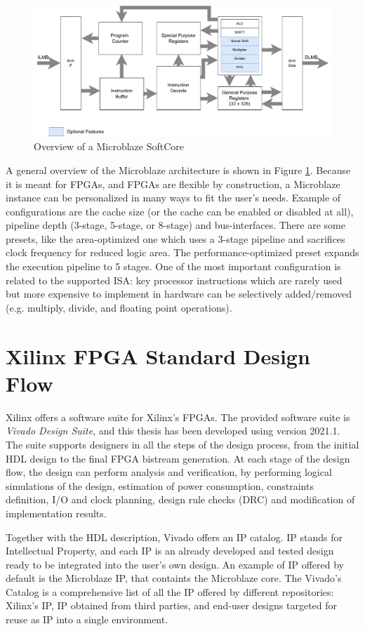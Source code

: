 \begin{figure}[H]
\centering
\includegraphics[width=0.8\linewidth]{images/chapter3/ublaze_arch.pdf}
\caption{Overview of a Microblaze SoftCore}
\label{fig:ublaze}
\end{figure}

A general overview of the Microblaze architecture is shown in Figure \ref{fig:ublaze}. Because it is meant for FPGAs, and FPGAs are flexible by construction, a Microblaze instance can be personalized in many ways to fit the user's needs. Example of configurations are the cache size (or the cache can be enabled or disabled at all), pipeline depth (3-stage, 5-stage, or 8-stage) and bus-interfaces. There are some presets, like the area-optimized one which uses a 3-stage pipeline and sacrifices clock frequency for reduced logic area. The performance-optimized preset expands the execution pipeline to 5 stages. One of the most important configuration is related to the supported ISA: key processor instructions which are rarely used but more expensive to implement in hardware can be selectively added/removed (e.g. multiply, divide, and floating point operations).

\section{Xilinx FPGA Standard Design Flow}

Xilinx offers a software suite for Xilinx's FPGAs. The provided software suite is \textit{Vivado Design Suite}, and this thesis has been developed using version 2021.1. The suite supports designers in all the steps of the design process, from the initial HDL design to the final FPGA bistream generation. At each stage of the design flow, the design can perform analysis and verification, by performing logical simulations of the design, estimation of power consumption, constraints definition, I/O and clock planning, design rule checks (DRC) and modification of implementation results.\bigskip

Together with the HDL description, Vivado offers an IP catalog. IP stands for Intellectual Property, and each IP is an already developed and tested design ready to be integrated into the user's own design. An example of IP offered by default is the Microblaze IP, that containts the Microblaze core. The Vivado's Catalog is a comprehensive list of all the IP offered by different repositories: Xilinx's IP, IP obtained from third parties, and end-user designs targeted for reuse as IP into a single environment. \bigskip

